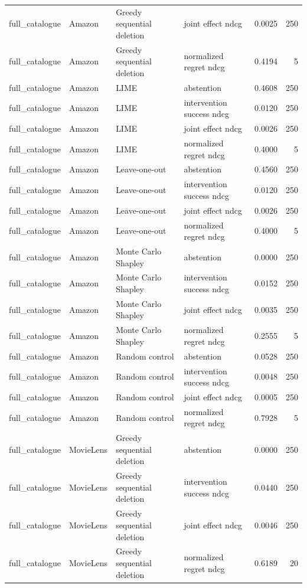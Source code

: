\begin{longtable}{@{}p{}p{}p{}p{}rr@{}}
full\_catalogue & Amazon & Greedy sequential deletion & joint effect ndcg & 0.0025 & 250 \\
full\_catalogue & Amazon & Greedy sequential deletion & normalized regret ndcg & 0.4194 & 5 \\
full\_catalogue & Amazon & LIME & abstention & 0.4608 & 250 \\
full\_catalogue & Amazon & LIME & intervention success ndcg & 0.0120 & 250 \\
full\_catalogue & Amazon & LIME & joint effect ndcg & 0.0026 & 250 \\
full\_catalogue & Amazon & LIME & normalized regret ndcg & 0.4000 & 5 \\
full\_catalogue & Amazon & Leave-one-out & abstention & 0.4560 & 250 \\
full\_catalogue & Amazon & Leave-one-out & intervention success ndcg & 0.0120 & 250 \\
full\_catalogue & Amazon & Leave-one-out & joint effect ndcg & 0.0026 & 250 \\
full\_catalogue & Amazon & Leave-one-out & normalized regret ndcg & 0.4000 & 5 \\
full\_catalogue & Amazon & Monte Carlo Shapley & abstention & 0.0000 & 250 \\
full\_catalogue & Amazon & Monte Carlo Shapley & intervention success ndcg & 0.0152 & 250 \\
full\_catalogue & Amazon & Monte Carlo Shapley & joint effect ndcg & 0.0035 & 250 \\
full\_catalogue & Amazon & Monte Carlo Shapley & normalized regret ndcg & 0.2555 & 5 \\
full\_catalogue & Amazon & Random control & abstention & 0.0528 & 250 \\
full\_catalogue & Amazon & Random control & intervention success ndcg & 0.0048 & 250 \\
full\_catalogue & Amazon & Random control & joint effect ndcg & 0.0005 & 250 \\
full\_catalogue & Amazon & Random control & normalized regret ndcg & 0.7928 & 5 \\
full\_catalogue & MovieLens & Greedy sequential deletion & abstention & 0.0000 & 250 \\
full\_catalogue & MovieLens & Greedy sequential deletion & intervention success ndcg & 0.0440 & 250 \\
full\_catalogue & MovieLens & Greedy sequential deletion & joint effect ndcg & 0.0046 & 250 \\
full\_catalogue & MovieLens & Greedy sequential deletion & normalized regret ndcg & 0.6189 & 20 \\

\end{longtable}
